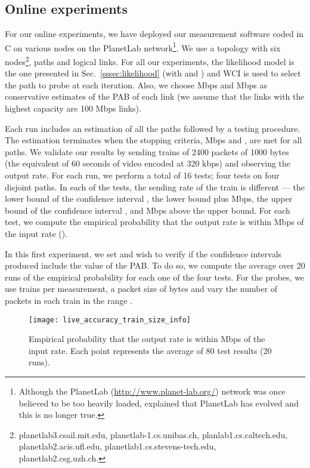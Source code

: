 \documentclass[final,5p,times,twocolumn]{elsarticle}
\begin{document}
\subsection{Online experiments}
\label{ssec:exp}

For our online experiments, we have deployed our measurement software coded in C on various nodes on the PlanetLab network\footnote{Although the PlanetLab (\url{http://www.planet-lab.org/}) network was once believed to be too heavily loaded, \citet{spr:06} explained that PlanetLab has evolved and this is no longer true.}.  
We use a topology with six nodes\footnote{planetlab3.csail.mit.edu, planetlab-1.cs.unibas.ch, planlab1.cs.caltech.edu, planetlab2.acis.ufl.edu, planetlab1.cs.stevens-tech.edu, planetlab2.csg.uzh.ch.},  paths and  logical links.  For all our experiments, the likelihood model is the one presented in Sec.~\ref{sssec:likelihood} (with  and ) and WCI is used to select the path to probe at each iteration.  Also, we choose  Mbps and  Mbps as conservative estimates of the PAB of each link (we assume that the links with the highest capacity are 100 Mbps links).

Each run includes an estimation of all the paths followed by a testing procedure.
The estimation terminates when the stopping criteria,  Mbps and , are met for all paths.
We validate our results by sending trains of 2400 packets of 1000 bytes (the equivalent of 60 seconds of video encoded at 320 kbps) and observing the output rate.
For each run, we perform a total of 16 tests; four tests on four disjoint paths.  In each of the tests, the sending rate of the train is different --- the lower bound of the confidence interval , the lower bound plus  Mbps, the upper bound of the confidence interval , and  Mbps above the upper bound.  For each test, we compute the empirical probability that the output rate is within  Mbps of the input rate ().  

In this first experiment, we set  and wish to verify if the confidence intervals produced include the value of the PAB.  To do so, we compute the average over 20 runs of the empirical probability  for each one of the four tests.  
For the probes, we use  trains per measurement, a packet size of  bytes and vary the number of packets in each train in the range .  

\begin{figure}[!h]
	\centering
	\texttt{[image: live\_accuracy\_train\_size\_info]}
	\caption{Empirical probability that the output rate is within  Mbps of the input rate.  Each point represents the average of 80 test results (20 runs).\label{fig:live_accuracy_train_size_info}}
\end{figure}
\end{document}
